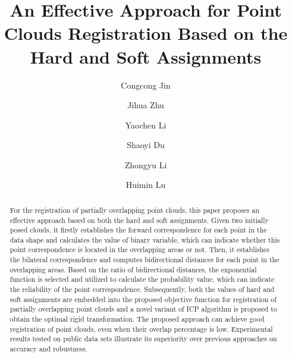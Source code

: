 \documentclass[review]{elsarticle}
\begin{document}

%

\begin{frontmatter}


\title{An Effective Approach for Point Clouds Registration Based on the Hard and Soft Assignments}






\author{Congcong Jin}
\author[add1]{Jihua Zhu}
\author{Yaochen Li}
\author{Shaoyi Du}
\author{Zhongyu Li}
\author{Huimin Lu}
\address[add1]{School of Software Engineering, Xi'an Jiaotong University, China}
\address[add2]{University of North Carolina at Charlotte, USA}
\address[add3]{Kyushu Institute of Technology, Japan}





\begin{abstract}
For the registration of partially overlapping point clouds, this paper proposes an effective approach based on both the hard and soft assignments. Given two initially posed clouds, it firstly establishes the forward correspondence for each point in the data shape and calculates the value of binary variable, which can indicate whether this point correspondence is located in the overlapping areas or not. Then, it establishes the bilateral correspondence and computes bidirectional distances for each point in the overlapping areas. Based on the ratio of bidirectional distances, the exponential function is selected and utilized to calculate the probability value, which can indicate the reliability of the point correspondence. Subsequently, both the values of hard and soft assignments are embedded into the proposed objective function for registration of partially overlapping point clouds and a novel variant of ICP algorithm is proposed to obtain the optimal rigid transformation. The proposed approach can achieve good registration of point clouds, even when their overlap percentage is low. Experimental results tested on public data sets illustrate its superiority over previous approaches on accuracy and robustness.
\end{abstract}


\end{frontmatter}
\end{document}
